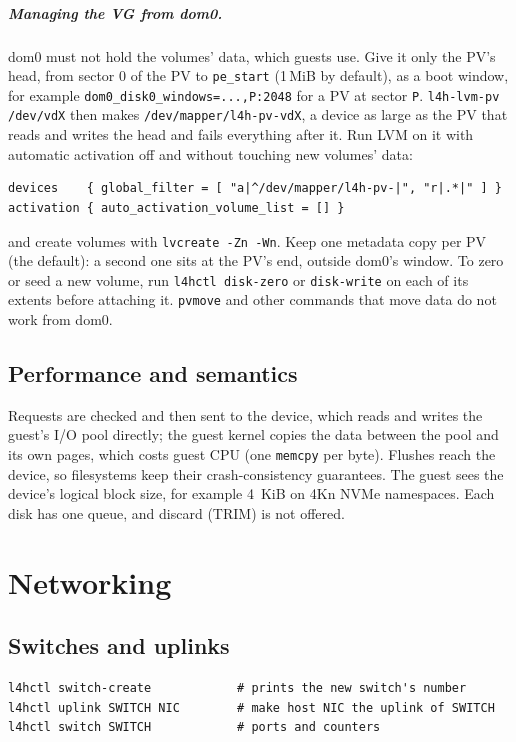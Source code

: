 \documentclass[11pt,a4paper]{report}
\newcommand{\cmd}[1]{\texttt{#1}}
\newcommand{\file}[1]{\texttt{#1}}
\begin{document}
\paragraph{Managing the VG from dom0.} dom0 must not hold the volumes'
data, which guests use. Give it only the PV's head, from sector 0 of the PV
to \texttt{pe\_start} (1\,MiB by default), as a boot window, for example
\texttt{dom0\_disk0\_windows=...,P:2048} for a PV at sector
\texttt{P}. \cmd{l4h-lvm-pv /dev/vdX} then makes
\file{/dev/mapper/l4h-pv-vdX}, a device as large as the PV that reads and
writes the head and fails everything after it. Run LVM on it with automatic
activation off and without touching new volumes' data:
\begin{lstlisting}
devices    { global_filter = [ "a|^/dev/mapper/l4h-pv-|", "r|.*|" ] }
activation { auto_activation_volume_list = [] }
\end{lstlisting}
and create volumes with \cmd{lvcreate -Zn -Wn}. Keep one metadata copy per
PV (the default): a second one sits at the PV's end, outside dom0's
window. To zero or seed a new volume, run \cmd{l4hctl disk-zero} or
\cmd{disk-write} on each of its extents before attaching it.
\cmd{pvmove} and other commands that move data do not work from dom0.

\section{Performance and semantics}

Requests are checked and then sent to the device, which reads and writes
the guest's I/O pool directly; the guest kernel copies the data between the
pool and its own pages, which costs guest CPU (one \texttt{memcpy} per
byte). Flushes reach the device, so filesystems keep their
crash-consistency guarantees. The guest sees the device's logical block
size, for example 4~KiB on 4Kn NVMe namespaces. Each disk has one queue, and
discard (TRIM) is not offered.

\chapter{Networking}
\label{ch:network}

\section{Switches and uplinks}

\begin{lstlisting}
l4hctl switch-create            # prints the new switch's number
l4hctl uplink SWITCH NIC        # make host NIC the uplink of SWITCH
l4hctl switch SWITCH            # ports and counters
\end{lstlisting}
\end{document}
